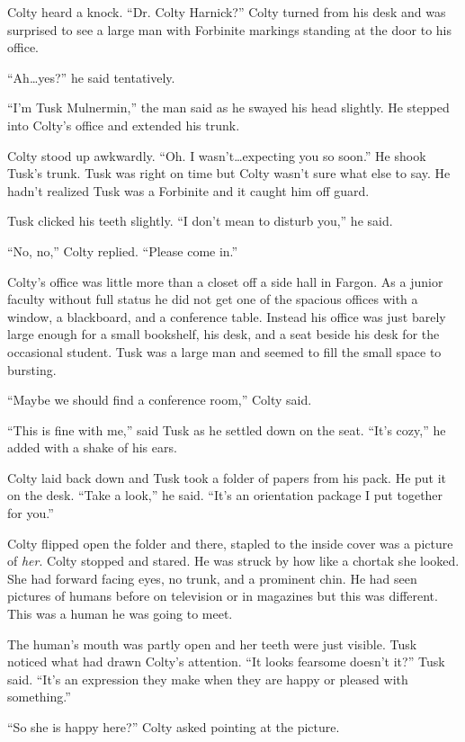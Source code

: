 
Colty heard a knock. ``Dr. Colty Harnick?'' Colty turned from his desk and was surprised to see
a large man with Forbinite markings standing at the door to his office.

``Ah\ldots yes?'' he said tentatively.

``I'm Tusk Mulnermin,'' the man said as he swayed his head slightly. He stepped into Colty's
office and extended his trunk.

Colty stood up awkwardly. ``Oh. I wasn't\ldots expecting you so soon.'' He shook Tusk's trunk.
Tusk was right on time but Colty wasn't sure what else to say. He hadn't realized Tusk was a
Forbinite and it caught him off guard.

Tusk clicked his teeth slightly. ``I don't mean to disturb you,'' he said.

``No, no,'' Colty replied. ``Please come in.''

Colty's office was little more than a closet off a side hall in Fargon. As a junior faculty
without full status he did not get one of the spacious offices with a window, a blackboard, and
a conference table. Instead his office was just barely large enough for a small bookshelf, his
desk, and a seat beside his desk for the occasional student. Tusk was a large man and seemed to
fill the small space to bursting.

``Maybe we should find a conference room,'' Colty said.

``This is fine with me,'' said Tusk as he settled down on the seat. ``It's cozy,'' he added with
a shake of his ears.

Colty laid back down and Tusk took a folder of papers from his pack. He put it on the desk.
``Take a look,'' he said. ``It's an orientation package I put together for you.''

Colty flipped open the folder and there, stapled to the inside cover was a picture of
\emph{her}. Colty stopped and stared. He was struck by how like a chortak she looked. She had
forward facing eyes, no trunk, and a prominent chin. He had seen pictures of humans before on
television or in magazines but this was different. This was a human he was going to meet.

The human's mouth was partly open and her teeth were just visible. Tusk noticed what had drawn
Colty's attention. ``It looks fearsome doesn't it?'' Tusk said. ``It's an expression they make
when they are happy or pleased with something.''

``So she is happy here?'' Colty asked pointing at the picture.

